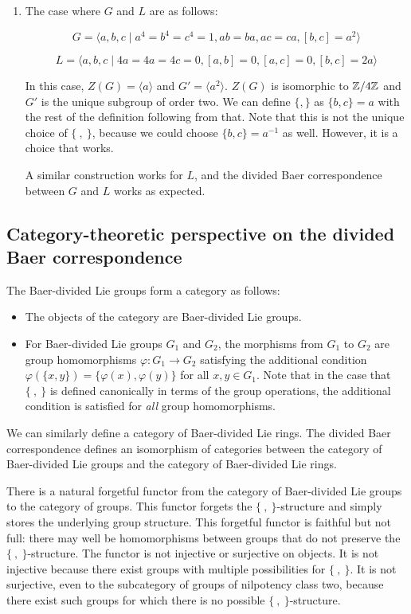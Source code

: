\begin{enumerate}
\item The case where $G$ and $L$ are as follows:

  $$G = \langle a,b,c \mid a^4 = b^4 = c^4 = 1, ab = ba, ac = ca, [b,c] = a^2 \rangle$$

  $$L = \langle a,b,c \mid 4a = 4a = 4c = 0, [a,b] = 0, [a,c] = 0, [b,c] = 2a \rangle$$

  In this case, $Z(G) = \langle a \rangle$ and $G' = \langle a^2
  \rangle$. $Z(G)$ is isomorphic to $\mathbb{Z}/4\mathbb{Z}$ and $G'$ is the unique
  subgroup of order two. We can define $\{ , \}$ as $\{ b,c \} = a$
  with the rest of the definition following from that. Note that this
  is not the unique choice of $\{ \ , \ \}$, because we could choose
  $\{ b,c \} = a^{-1}$ as well. However, it is a choice that works.

  A similar construction works for $L$, and the divided Baer
  correspondence between $G$ and $L$ works as expected.
\end{enumerate}

\subsection{Category-theoretic perspective on the divided Baer correspondence}

The Baer-divided Lie groups form a category as follows:

\begin{itemize}
\item The objects of the category are Baer-divided Lie groups.
\item For Baer-divided Lie groups $G_1$ and $G_2$, the morphisms from
  $G_1$ to $G_2$ are group homomorphisms $\varphi:G_1 \to G_2$
  satisfying the additional condition $\varphi(\{x,y \}) =
  \{\varphi(x),\varphi(y) \}$ for all $x,y \in G_1$. Note that in the
  case that $\{ \ , \ \}$ is defined canonically in terms of the group
  operations, the additional condition is satisfied for {\em all}
  group homomorphisms.
\end{itemize}

We can similarly define a category of Baer-divided Lie rings. The
divided Baer correspondence defines an isomorphism of categories
between the category of Baer-divided Lie groups and the category of
Baer-divided Lie rings.

There is a natural forgetful functor from the category of Baer-divided
Lie groups to the category of groups. This functor forgets the $\{ \ ,
\ \}$-structure and simply stores the underlying group structure. This
forgetful functor is faithful but not full: there may well be
homomorphisms between groups that do not preserve the $\{ \ ,
\ \}$-structure. The functor is not injective or surjective on
objects. It is not injective because there exist groups with multiple
possibilities for $\{ \ , \ \}$. It is not surjective, even to the
subcategory of groups of nilpotency class two, because there exist
such groups for which there is no possible $\{ \ , \ \}$-structure.


